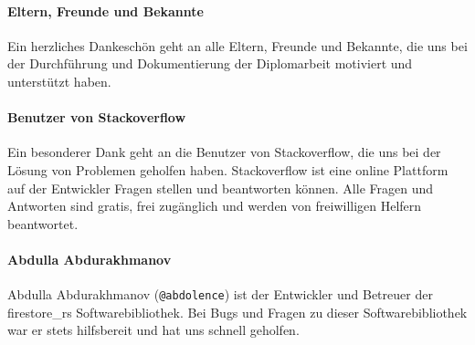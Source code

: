 \paragraph*{Eltern, Freunde und Bekannte}
Ein herzliches Dankeschön geht an alle Eltern, Freunde und Bekannte, die uns bei der Durchführung und Dokumentierung der Diplomarbeit motiviert und unterstützt haben.

\paragraph*{Benutzer von Stackoverflow}
Ein besonderer Dank geht an die Benutzer von Stackoverflow, die uns bei der Lösung von Problemen geholfen haben. Stackoverflow ist eine online Plattform auf der Entwickler Fragen stellen und beantworten können. Alle Fragen und Antworten sind gratis, frei zugänglich und werden von freiwilligen Helfern beantwortet.

\paragraph*{Abdulla Abdurakhmanov }
Abdulla Abdurakhmanov (\texttt{@abdolence}) ist der Entwickler und Betreuer der firestore\_rs Softwarebibliothek. Bei Bugs und Fragen zu dieser Softwarebibliothek war er stets hilfsbereit und hat uns schnell geholfen.

